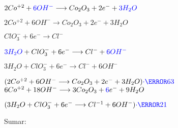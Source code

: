 \documentclass[../Práctica.root.tex]{subfiles}
\newcommand{\lra}{\ensuremath{\longrightarrow{}}}
\begin{document}
\begin{enumerate}
\begin{enumerate}
\begin{itemize}
\begin{multicols}{2}

                                  $2 Co^{+2} + \blue{6 OH^-} \lra Co_2O_3 + 2 e^- + \blue{3H_2O}$


                                  $2 Co^{+2} + 6 OH^- \lra Co_2O_3 + 2 e^- + 3 H_2O$

                                  \columnbreak

                                  $ClO_3^- + 6 e^- \lra Cl^-$


                                  $\blue{3H_2O} + ClO_3^- + 6 e^- \lra Cl^- + \blue{6OH^-}$


                                  $3 H_2O + ClO_3^- + 6 e^- \lra Cl^- + 6 OH^-$
                              \end{multicols}
                              \begin{multicols}{2}
                                  $(2 Co^{+2} + 6 OH^- \lra Co_2O_3 + 2 e^- + 3 H_2O)\blue{\cdot\cancel{6}{3}}$ \\
                                  $6 Co^{+2} + 18 OH^- \lra 3 Co_2O_3 + \blue{6} e^- + 9 H_2O$

                                  \columnbreak

                                  $(3 H_2O + ClO_3^- + 6 e^- \lra Cl^{-1} + 6 OH^-)\blue{\cdot\cancel{2}{1}}$
                              \end{multicols}
                              Sumar:


\end{itemize}
\end{enumerate}
\end{enumerate}
\end{document}
